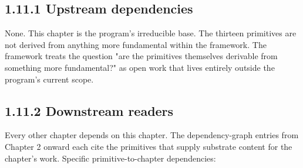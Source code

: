 \documentclass[11pt]{book}
\begin{document}
\subsection{1.11.1 Upstream dependencies}

None. This chapter is the program's irreducible base. The thirteen primitives are not derived from anything more fundamental within the framework. The framework treats the question "are the primitives themselves derivable from something more fundamental?" as open work that lives entirely outside the program's current scope.

\subsection{1.11.2 Downstream readers}

Every other chapter depends on this chapter. The dependency-graph entries from Chapter 2 onward each cite the primitives that supply substrate content for the chapter's work. Specific primitive-to-chapter dependencies:
\end{document}
